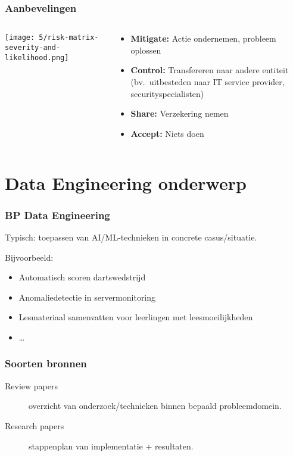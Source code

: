 \documentclass[aspectratio=169]{beamer}
\begin{document}
\begin{frame}
  \frametitle{Aanbevelingen}

  \begin{columns}
    \begin{column}{.5\textwidth}
      \texttt{[image: 5/risk-matrix-severity-and-likelihood.png]}
    \end{column}

    \begin{column}{.5\textwidth}
      \begin{itemize}
        \item \textbf{Mitigate:} Actie ondernemen, probleem oplossen
        \item \textbf{Control:} Transfereren naar andere entiteit (bv.\ uitbesteden naar IT service provider, securityspecialisten)
        \item \textbf{Share:} Verzekering nemen
        \item \textbf{Accept:} Niets doen
      \end{itemize}
    \end{column}
  \end{columns}

\end{frame}

\section{Data Engineering onderwerp}

\begin{frame}
  \frametitle{BP Data Engineering}

  Typisch: toepassen van AI/ML-technieken in concrete casus/situatie.
  
  \bigskip

  Bijvoorbeeld:

  \begin{itemize}
    \item Automatisch scoren dartswedstrijd
    \item Anomaliedetectie in servermonitoring
    \item Lesmateriaal samenvatten voor leerlingen met leesmoeilijkheden
    \item \ldots
  \end{itemize}

\end{frame}

\begin{frame}
  \frametitle{Soorten bronnen}

  \begin{description}
    \item[Review papers] overzicht van onderzoek/technieken binnen bepaald probleemdomein.
    \item[Research papers] stappenplan van implementatie + resultaten.
  \end{description}

\end{frame}
\end{document}
